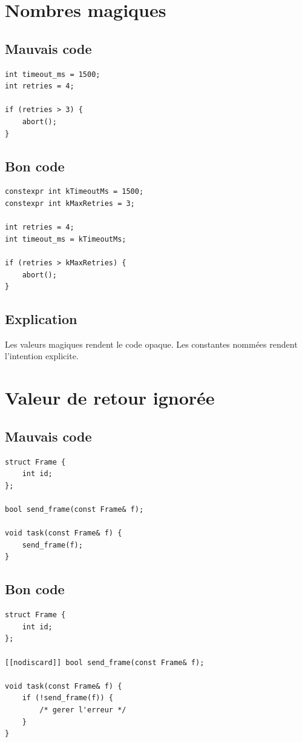 \documentclass[a4paper,11pt]{report}
\begin{document}
\chapter{Nombres magiques}

\section{Mauvais code}
\begin{lstlisting}
int timeout_ms = 1500;
int retries = 4;

if (retries > 3) {
    abort();
}
\end{lstlisting}

\section{Bon code}
\begin{lstlisting}
constexpr int kTimeoutMs = 1500;
constexpr int kMaxRetries = 3;

int retries = 4;
int timeout_ms = kTimeoutMs;

if (retries > kMaxRetries) {
    abort();
}
\end{lstlisting}

\section{Explication}
Les valeurs magiques rendent le code opaque.
Les constantes nommées rendent l'intention explicite.

\chapter{Valeur de retour ignorée}

\section{Mauvais code}
\begin{lstlisting}
struct Frame {
    int id;
};

bool send_frame(const Frame& f);

void task(const Frame& f) {
    send_frame(f);
}
\end{lstlisting}

\section{Bon code}
\begin{lstlisting}
struct Frame {
    int id;
};

[[nodiscard]] bool send_frame(const Frame& f);

void task(const Frame& f) {
    if (!send_frame(f)) {
        /* gerer l'erreur */
    }
}
\end{lstlisting}
\end{document}
